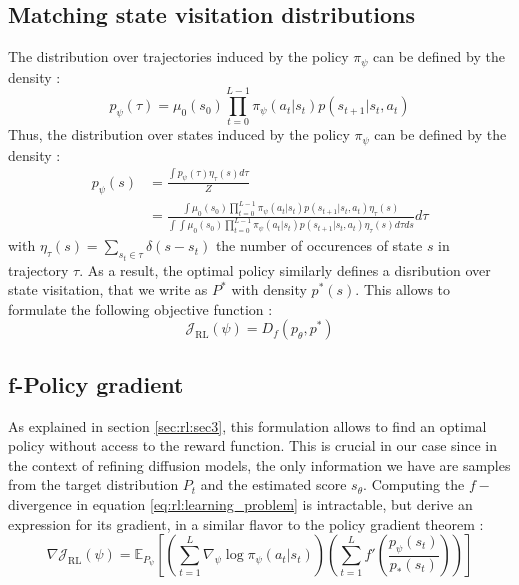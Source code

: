 \subsection{Matching state visitation distributions}
The distribution over trajectories induced by the policy $\pi_{\psi}$ can be defined by the density : 
\begin{equation}
    p_{\psi}(\tau) = \mu_{0}(s_{0})\prod_{t=0}^{L-1} \pi_{\psi}(a_{t}|s_{t})p(s_{t+1}|s_{t},a_{t})
\end{equation}
Thus, the distribution over states induced by the policy $\pi_{\psi}$ can be defined by the density :
\begin{align}
    p_{\psi}(s) &= \frac{\int p_{\psi}(\tau)\eta_{\tau}(s) d\tau}{Z} \\
    &= \frac{\int \mu_{0}(s_{0})\prod_{t=0}^{L-1} \pi_{\psi}(a_{t}|s_{t})p(s_{t+1}|s_{t},a_{t})\eta_{\tau}(s)}{\int \int \mu_{0}(s_{0})\prod_{t=0}^{L-1} \pi_{\psi}(a_{t}|s_{t})p(s_{t+1}|s_{t},a_{t})\eta_{\tau}(s) d\tau ds } d\tau
\end{align}
with $\eta_{\tau}(s) = \sum_{s_{t} \in \tau } \delta(s - s_{t})$ the number of occurences of state $s$ in trajectory $\tau$.
As a result, the optimal policy similarly defines a disribution over state visitation, that we write as $P^{*}$ with density $p^{*}(s)$. This allows to formulate the following objective function :
\begin{equation}\label{eq:rl:learning_problem}
    \mathcal{J}_{\mathrm{RL}}(\psi) = D_{f}(p_{\theta},p^{*})
\end{equation}
\subsection{f-Policy gradient}
As explained in section \ref*{sec:rl:sec3}, this formulation allows to find an optimal policy without access to the reward function. This is crucial in our case since in the context of refining diffusion models, the only information we have are samples from the target distribution $P_{t}$ and the estimated score $s_{\theta}$.
Computing the $f-$divergence in equation \ref{eq:rl:learning_problem} is intractable, but \citep{agarwal_f-policy_2023} derive an expression for its gradient, in a similar flavor to the policy gradient theorem \citep{NIPS1999_464d828b} :
\begin{equation}
    \nabla  \mathcal{J}_{\mathrm{RL}}(\psi) =  \mathbb{E}_{P_{\psi}} \left[ \left( \sum_{t=1}^{L} \nabla_{\psi} \log \pi_{\psi}(a_{t}|s_{t})  \right) \left(\sum_{t=1}^{L}f'\left( \frac{p_{\psi}(s_{t})}{p_{*}(s_{t})} \right)   \right)   \right]
\end{equation}

